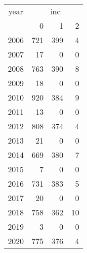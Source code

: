 \footnotesize\begin{tabular}[t]{lrrr}
\toprule
\multicolumn{1}{c}{year} & \multicolumn{3}{c}{inc} \\
\cmidrule(l{3pt}r{3pt}){1-1} \cmidrule(l{3pt}r{3pt}){2-4}
  & 0 & 1 & 2\\
\midrule
2006 & 721 & 399 & 4\\
2007 & 17 & 0 & 0\\
2008 & 763 & 390 & 8\\
2009 & 18 & 0 & 0\\
2010 & 920 & 384 & 9\\
2011 & 13 & 0 & 0\\
2012 & 808 & 374 & 4\\
2013 & 21 & 0 & 0\\
2014 & 669 & 380 & 7\\
2015 & 7 & 0 & 0\\
2016 & 731 & 383 & 5\\
2017 & 20 & 0 & 0\\
2018 & 758 & 362 & 10\\
2019 & 3 & 0 & 0\\
2020 & 775 & 376 & 4\\
\bottomrule
\end{tabular}
